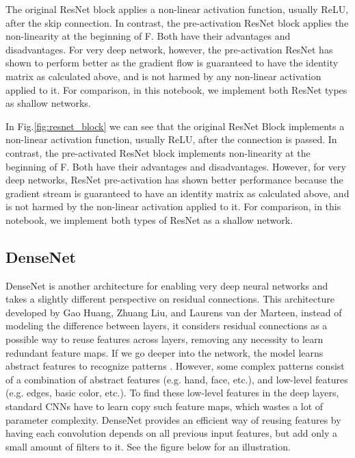 \documentclass[peerreview]{IEEEtran}
\begin{document}
The original ResNet block applies a non-linear activation function, usually ReLU, after the skip connection. In contrast, the pre-activation ResNet block applies the non-linearity at the beginning of F. Both have their advantages and disadvantages. For very deep network, however, the pre-activation ResNet has shown to perform better as the gradient flow is guaranteed to have the identity matrix as calculated above, and is not harmed by any non-linear activation applied to it. For comparison, in this notebook, we implement both ResNet types as shallow networks.

In Fig.\ref{fig:resnet_block} we can see that the original ResNet Block implements a non-linear activation function, usually ReLU, after the connection is passed. In contrast, the pre-activated ResNet block implements non-linearity at the beginning of F. Both have their advantages and disadvantages. However, for very deep networks, ResNet pre-activation has shown better performance because the gradient stream is guaranteed to have an identity matrix as calculated above, and is not harmed by the non-linear activation applied to it. For comparison, in this notebook, we implement both types of ResNet as a shallow network.

\subsection{DenseNet}
DenseNet is another architecture for enabling very deep neural networks and takes a slightly different perspective on residual connections. This architecture developed by Gao Huang, Zhuang Liu, and Laurens van der Marteen, instead of modeling the difference between layers, it considers residual connections as a possible way to reuse features across layers, removing any necessity to learn redundant feature maps. If we go deeper into the network, the model learns abstract features to recognize patterns \cite{huang2017densely}. However, some complex patterns consist of a combination of abstract features (e.g. hand, face, etc.), and low-level features (e.g. edges, basic color, etc.). To find these low-level features in the deep layers, standard CNNs have to learn copy such feature maps, which wastes a lot of parameter complexity. DenseNet provides an efficient way of reusing features by having each convolution depends on all previous input features, but add only a small amount of filters to it. See the figure below for an illustration.
\end{document}
